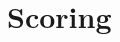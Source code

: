 \documentclass[a4paper,12pt]{article}
\begin{document}



\newpage


\section{Scoring}
\end{document}
